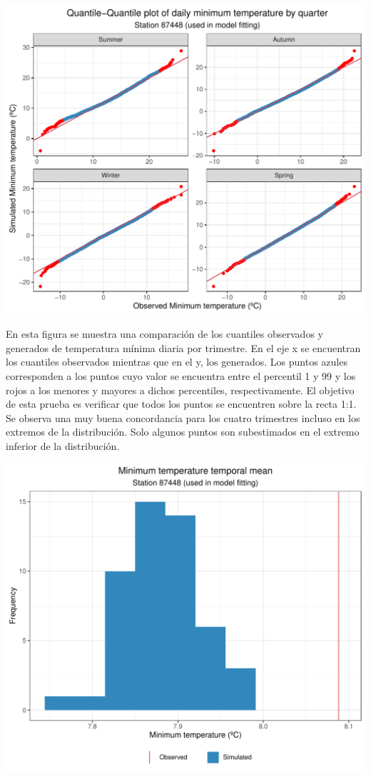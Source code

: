 \documentclass[
]{article}
\begin{document}
\begin{center}\includegraphics{Webinario_Generador_files/figure-latex/unnamed-chunk-47-1} \end{center}

En esta figura se muestra una comparación de los cuantiles observados y generados de temperatura mínima diaria por trimestre. En el eje x se encuentran los cuantiles observados mientras que en el y, los generados. Los puntos azules corresponden a los puntos cuyo valor se encuentra entre el percentil 1 y 99 y los rojos a los menores y mayores a dichos percentiles, respectivamente. El objetivo de esta prueba es verificar que todos los puntos se encuentren sobre la recta 1:1. Se observa una muy buena concordancia para los cuatro trimestres incluso en los extremos de la distribución. Solo algunos puntos son subestimados en el extremo inferior de la distribución.

\begin{center}\includegraphics{Webinario_Generador_files/figure-latex/unnamed-chunk-48-1} \end{center}
\end{document}
